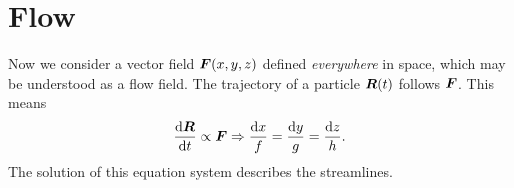\documentclass[hyperref, a4paper]{article}
\begin{document}
\section{Flow}

Now we consider a vector field $\vb*{F}(x, y, z)$ defined \emph{everywhere} in space,
which may be understood as a flow field.
The trajectory of a particle $\vb*{R}(t)$ follows $\vb*{F}$.
This means 
\begin{equation}
    \dv{\vb*{R}}{t} \propto \vb*{F} \Rightarrow
    \frac{\dd{x}}{f} = \frac{\dd{y}}{g} = \frac{\dd{z}}{h}.
\end{equation}
The solution of this equation system 
describes the streamlines.
\end{document}
